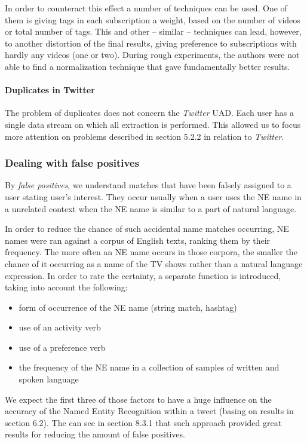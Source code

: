 In order to counteract this effect a number of techniques can be used. One of
them is giving tags in each subscription a weight, based on the number of videos or
total number of tags. This and other -- similar -- techniques can lead,
however, to another distortion of the final results, giving preference to
subscriptions with hardly any videos (one or two). During rough experiments,
the authors were not able to find a normalization technique that gave
fundamentally better results.

\paragraph{Duplicates in Twitter}
The problem of duplicates does not concern the \textit{Twitter} UAD. Each user has a single
data stream on which all extraction is performed. This allowed us to focus more attention
on problems described in section 5.2.2 in relation to \textit{Twitter}.

\subsubsection{Dealing with false positives}
By \textit{false positives}, we understand matches that have been falsely assigned to a user stating user's interest.
They occur usually when a user uses the NE name in a unrelated context when the NE name is similar to a
part of natural language.

In order to reduce the chance of such accidental name matches occurring, NE names were ran against a corpus
of English texts, ranking them by their frequency. The more often an NE name occurs in those corpora, the smaller the chance of it occurring as a name of the TV shows rather than a natural language expression. In order to rate the certainty, a separate function is introduced, taking into account the following:

\begin{itemize}
  \item form of occurrence of the NE name (string match, hashtag)
  \item use of an activity verb
  \item use of a preference verb
  \item the frequency of the NE name in a collection of samples of written and spoken language
\end{itemize}

We expect the first three of those factors to have a huge influence on the accuracy of the Named Entity Recognition within
a tweet (basing on results in section 6.2). The can see in section 8.3.1 that such approach provided great results for
reducing the amount of false positives.

